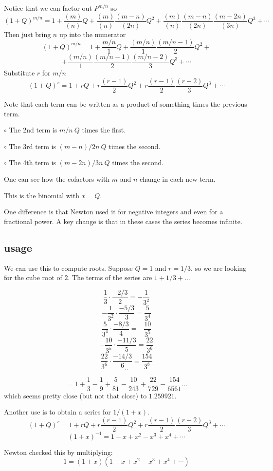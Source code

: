 \documentclass[11pt, oneside]{article}
\begin{document}
Notice that we can factor out $P^{m/n}$ so
\[ (1 + Q)^{m/n} = 1 + \frac{(m)}{(n)} Q  + \frac{(m)}{(n)} \frac{(m-n)}{(2n)} Q^2 + \frac{(m)}{(n)} \frac{(m-n)}{(2n)} \frac{(m-2n)}{(3n)} Q^3 + \cdots \] 
Then just bring $n$ up into the numerator
\[ (1 + Q)^{m/n} = 1 + \frac{m/n}{1} Q  + \frac{(m/n)}{1} \frac{(m/n-1)}{2} Q^2 + \]
\[ + \frac{(m/n)}{1} \frac{(m/n-1)}{2} \frac{(m/n-2)}{3} Q^3 + \cdots \] 
Substitute $r$ for $m/n$
\[ (1 + Q)^r = 1 + r Q  + r \frac{(r-1)}{2} Q^2 + r \frac{(r-1)}{2} \frac{(r-2)}{3} Q^3 + \cdots \] 

Note that each term can be written as a product of something times the previous term.

$\circ$ The 2nd term is $m/n \ Q$ times the first.

$\circ$ The 3rd term is $(m-n)/2n \ Q$ times the second.

$\circ$ The 4th term is $(m-2n)/3n \ Q$ times the second.

One can see how the cofactors with $m$ and $n$ change in each new term.

This is the binomial with $x = Q$.

One difference is that Newton used it for negative integers and even for a fractional power.  A key change is that in these cases the series becomes infinite.

\subsection*{usage}
We can use this to compute roots.  Suppose $Q = 1$ and $r = 1/3$, so we are looking for the cube root of $2$.  The terms of the series are $1 + 1/3 + \dots$

\[ \frac{1}{3} \cdot \frac{-2/3}{2} = - \frac{1}{3^2} \]
\[ - \frac{1}{3^2} \cdot \frac{-5/3}{3} = \frac{5}{3^4} \]
\[  \frac{5}{3^4} \cdot \frac{-8/3}{4} = -\frac{10}{3^5} \]
\[ -\frac{10}{3^5} \cdot \frac{-11/3}{5} = \frac{22}{3^6} \]
\[  \frac{22}{3^6} \cdot \frac{-14/3}{6} = \frac{154}{3^8} \]
\[ .. \]


\[ = 1 + \frac{1}{3} - \frac{1}{9} + \frac{5}{81} - \frac{10}{243} + \frac{22}{729} - \frac{154}{6561} \dots  \]
which seems pretty close (but not that close) to $1.259921$.

Another use is to obtain a series for $1/(1+x)$.
\[ (1 + Q)^r = 1 + rQ + r\frac{(r-1)}{2}Q^2 + r\frac{(r-1)}{2}\frac{(r-2)}{3}Q^3 + \cdots \]
\[ (1+x)^{-1} = 1 - x + x^2 - x^3 + x^4 + \cdots  \]

Newton checked this by multiplying:
\[ 1 = (1+x)(1 - x + x^2 - x^3 + x^4 + \cdots)  \]
\end{document}
